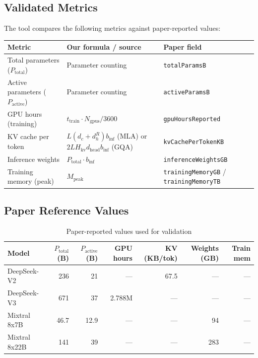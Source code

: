 \documentclass[11pt]{article}
\begin{document}
\subsection{Validated Metrics}

The tool compares the following metrics against paper-reported values:

\begin{tabular}{lll}
\toprule
Metric & Our formula / source & Paper field \\
\midrule
Total parameters ($P_{\text{total}}$) & Parameter counting & \texttt{totalParamsB} \\
Active parameters ($P_{\text{active}}$) & Parameter counting & \texttt{activeParamsB} \\
GPU hours (training) & $t_{\text{train}} \cdot N_{\text{gpus}} / 3600$ & \texttt{gpuHoursReported} \\
KV cache per token & $L (d_c + d^R_h) b_{\text{inf}}$ (MLA) or $2 L H_{\text{kv}} d_{\text{head}} b_{\text{inf}}$ (GQA) & \texttt{kvCachePerTokenKB} \\
Inference weights & $P_{\text{total}} \cdot b_{\text{inf}}$ & \texttt{inferenceWeightsGB} \\
Training memory (peak) & $M_{\text{peak}}$ & \texttt{trainingMemoryGB} / \texttt{trainingMemoryTB} \\
\bottomrule
\end{tabular}

\subsection{Paper Reference Values}

\begin{table}[h]
\centering
\caption{Paper-reported values used for validation}
\small
\begin{tabular}{lrrrrrr}
\toprule
Model & $P_{\text{total}}$ (B) & $P_{\text{active}}$ (B) & GPU hours & KV (KB/tok) & Weights (GB) & Train mem \\
\midrule
DeepSeek-V2 & 236 & 21 & --- & 67.5 & --- & --- \\
DeepSeek-V3 & 671 & 37 & 2.788M & --- & --- & --- \\
Mixtral 8x7B & 46.7 & 12.9 & --- & --- & 94 & --- \\
Mixtral 8x22B & 141 & 39 & --- & --- & 283 & --- \\
\bottomrule
\end{tabular}
\end{table}
\end{document}
